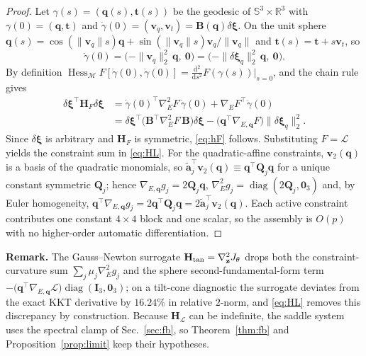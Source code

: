 \begin{proof}
Let $\gamma(s)=(\mathbf q(s),\mathbf t(s))$ be the geodesic of $\mathbb S^3\times\mathbb R^3$ with $\gamma(0)=(\mathbf q,\mathbf t)$ and $\dot\gamma(0)=(\mathbf v_q,\mathbf v_t)=\mathbf B(\mathbf q)\delta\boldsymbol\xi$. On the unit sphere $\mathbf q(s)=\cos(\|\mathbf v_q\|s)\mathbf q+\sin(\|\mathbf v_q\|s)\mathbf v_q/\|\mathbf v_q\|$ and $\mathbf t(s)=\mathbf t+s\mathbf v_t$, so
\[
\ddot\gamma(0)=\big(-\|\mathbf v_q\|_2^2\,\mathbf q,\ \mathbf 0\big)=\big(-\|\delta\boldsymbol\xi_q\|_2^2\,\mathbf q,\ \mathbf 0\big).
\]
By definition $\operatorname{Hess}_{\mathcal M}F[\dot\gamma(0),\dot\gamma(0)]=\frac{\mathrm d^2}{\mathrm ds^2}F(\gamma(s))|_{s=0}$, and the chain rule gives
\begin{equation}
\begin{aligned}
\delta\boldsymbol\xi^\top\mathbf H_F\delta\boldsymbol\xi
&=\dot\gamma(0)^\top\nabla_E^2F\,\dot\gamma(0)+\nabla_EF^\top\ddot\gamma(0)\\
&=\delta\boldsymbol\xi^\top\big(\mathbf B^\top\nabla_E^2F\,\mathbf B\big)\delta\boldsymbol\xi-\big(\mathbf q^\top\nabla_{E,\mathbf q}F\big)\|\delta\boldsymbol\xi_q\|_2^2 .
\end{aligned}
\end{equation}
Since $\delta\boldsymbol\xi$ is arbitrary and $\mathbf H_F$ is symmetric, \eqref{eq:hF} follows. Substituting $F=\mathcal L$ yields the constraint sum in \eqref{eq:HL}. For the quadratic-affine constraints, $\mathbf v_2(\mathbf q)$ is a basis of the quadratic monomials, so $\tilde{\mathbf a}_j^\top\mathbf v_2(\mathbf q)\equiv\mathbf q^\top\mathbf Q_j\mathbf q$ for a unique constant symmetric $\mathbf Q_j$; hence $\nabla_{E,\mathbf q}g_j=2\mathbf Q_j\mathbf q$, $\nabla_E^2g_j=\operatorname{diag}(2\mathbf Q_j,\mathbf 0_3)$ and, by Euler homogeneity, $\mathbf q^\top\nabla_{E,\mathbf q}g_j=2\mathbf q^\top\mathbf Q_j\mathbf q=2\tilde{\mathbf a}_j^\top\mathbf v_2(\mathbf q)$. Each active constraint contributes one constant $4\times4$ block and one scalar, so the assembly is $O(p)$ with no higher-order automatic differentiation.
\end{proof}
\textbf{Remark.} The Gauss--Newton surrogate $\mathbf H_{\rm tan}=\nabla^2_{\mathbf z}J_\theta$ drops both the constraint-curvature sum $\sum_j\mu_j\nabla_E^2g_j$ and the sphere second-fundamental-form term $-\big(\mathbf q^\top\nabla_{E,\mathbf q}\mathcal L\big)\operatorname{diag}(\mathbf I_3,\mathbf 0_3)$; on a tilt-cone diagnostic the surrogate deviates from the exact KKT derivative by $16.24\%$ in relative $2$-norm, and \eqref{eq:HL} removes this discrepancy by construction. Because $\mathbf H_{\mathcal L}$ can be indefinite, the saddle system uses the spectral clamp of Sec.~\ref{sec:fb}, so Theorem~\ref{thm:fb} and Proposition~\ref{prop:limit} keep their hypotheses.

